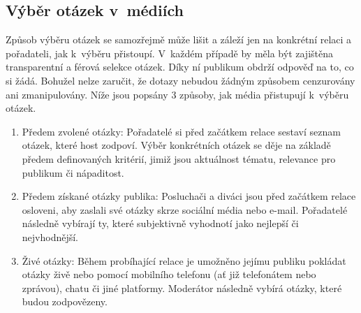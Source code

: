 \subsection*{Výběr otázek v~médiích}
Způsob výběru otázek se samozřejmě může lišit a záleží jen na konkrétní relaci a pořadateli, jak k~výběru přistoupí. V~každém případě by měla být zajištěna transparentní a férová selekce otázek. Díky ní publikum obdrží odpověď na to, co si žádá. Bohužel nelze zaručit, že dotazy nebudou žádným způsobem cenzurovány ani zmanipulovány. Níže jsou popsány 3 způsoby, jak média přistupují k~výběru otázek.
\begin{enumerate}
\item Předem zvolené otázky: Pořadatelé si před začátkem relace sestaví seznam otázek, které host zodpoví. Výběr konkrétních otázek se děje na základě předem definovaných kritérií, jimiž jsou aktuálnost tématu, relevance pro publikum či nápaditost.
\item Předem získané otázky publika: Posluchači a diváci jsou před začátkem relace osloveni, aby zaslali své otázky skrze sociální média nebo e-mail. Pořadatelé následně vybírají ty, které subjektivně vyhodnotí jako nejlepší či nejvhodnější.

\item Živé otázky: Během probíhající relace je umožněno jejímu publiku pokládat otázky živě nebo pomocí mobilního telefonu (ať již telefonátem nebo zprávou), chatu či jiné platformy. Moderátor následně vybírá otázky, které budou zodpovězeny. 
\end{enumerate}

